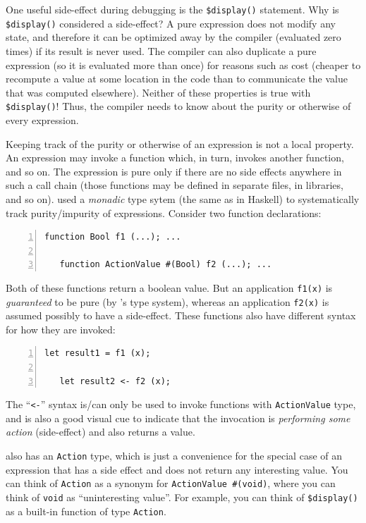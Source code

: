 One useful side-effect during debugging is the {\tt \$display()}
statement.  Why is {\tt \$display()} considered a side-effect?  A pure
expression does not modify any state, and therefore it can be
optimized away by the compiler (evaluated zero times) if its result is
never used.  The compiler can also duplicate a pure expression (so it
is evaluated more than once) for reasons such as cost (cheaper to
recompute a value at some location in the code than to communicate the
value that was computed elsewhere).  Neither of these properties is
true with {\tt \$display()}!  Thus, the compiler needs to know about
the purity or otherwise of every expression.

Keeping track of the purity or otherwise of an expression is not a
local property.  An expression may invoke a function which, in turn,
invokes another function, and so on.  The expression is pure only if
there are no side effects anywhere in such a call chain (those
functions may be defined in separate files, in libraries, and so on).
{\BSV} used a \emph{monadic} type sytem (the same as in Haskell) to
systematically track purity/impurity of expressions.  Consider two
function declarations:


{\footnotesize
\begin{Verbatim}[frame=single, numbers=left]
   function Bool f1 (...); ...

   function ActionValue #(Bool) f2 (...); ...
\end{Verbatim}
}

Both of these functions return a boolean value.  But an application
{\tt f1(x)} is \emph{guaranteed} to be pure (by {\BSV}'s type system),
whereas an application {\tt f2(x)} is assumed possibly to have a
side-effect.  These functions also have different syntax for how they
are invoked:

{\footnotesize
\begin{Verbatim}[frame=single, numbers=left]
   let result1 = f1 (x);

   let result2 <- f2 (x);
\end{Verbatim}
}

The ``\verb|<-|'' syntax is/can only be used to invoke functions with
\verb|ActionValue| type, and is also a good visual cue to indicate
that the invocation is \emph{performing some action} (side-effect) and
also returns a value.

{\BSV} also has an \verb|Action| type, which is just a convenience for
the special case of an expression that has a side effect and does not
return any interesting value.  You can think of \verb|Action| as a
synonym for \verb|ActionValue #(void)|, where you can think of
\verb|void| as ``uninteresting value''.  For example, you can think of
\verb|$display()| as a built-in function of type \verb|Action|.

